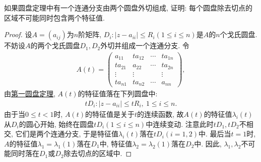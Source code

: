 \documentclass[../../main.tex]{subfiles}
\begin{document}
\begin{example}
如果圆盘定理中有一个连通分支由两个圆盘外切组成, 证明: 每个圆盘除去切点的区域不可能同时包含两个特征值.
\end{example}
\begin{proof}
设\(A = (a_{ij})\)为\(n\)阶矩阵, \(D_{i}:|z - a_{ii}| \leqslant  R_{i}(1 \leqslant  i \leqslant  n)\)是\(A\)的\(n\)个戈氏圆盘. 不妨设\(A\)的两个戈氏圆盘\(D_{1},D_{2}\)外切并组成一个连通分支. 令
\begin{align*}
A(t)= 
\begin{pmatrix}
a_{11} & ta_{12} & \cdots & ta_{1n}\\
ta_{21} & a_{22} & \cdots & ta_{2n}\\
\vdots & \vdots & & \vdots\\
ta_{n1} & ta_{n2} & \cdots & a_{nn}
\end{pmatrix},
\end{align*}
由\hyperref[theorem:第一圆盘定理]{第一圆盘定理}, \(A(t)\)的特征值落在下列圆盘中:
\begin{align*}
tD_{i}:|z - a_{ii}| \leqslant  tR_{i},\ 1 \leqslant  i \leqslant  n.
\end{align*}
由于当\(0 \leqslant  t < 1\)时, \(A(t)\)的特征值是关于\(t\)的连续函数, 故\(A(t)\)的特征值\(\lambda_{i}(t)\)从\(D_{i}\)的圆心开始, 始终在圆盘\(tD_{i}(1 \leqslant  i \leqslant  n)\)中连续变动. 注意此时\(tD_{1},tD_{2}\)不相交, 它们是两个连通分支, 于是特征值\(\lambda_{i}(t)\)落在\(tD_{i}(i = 1,2)\)中. 最后当\(t = 1\)时, \(A\)的特征值\(\lambda_{1}=\lambda_{1}(1)\)落在\(D_{1}\)中, 特征值\(\lambda_{2}=\lambda_{2}(1)\)落在\(D_{2}\)中. 因此, \(\lambda_{1},\lambda_{2}\)不可能同时落在\(D_{1}\)或\(D_{2}\)除去切点的区域中.
\end{proof}
\end{document}
